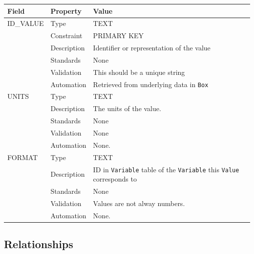 \documentclass[
]{article}
\newcounter{none}
\begin{document}
{\def\LTcaptype{none} 
\begin{longtable}[]{@{}
  >{\raggedright\arraybackslash}p{}
  >{\raggedright\arraybackslash}p{}
  >{\raggedright\arraybackslash}p{}@{}}
\toprule\noalign{}
\begin{minipage}[b]{\linewidth}\raggedright
Field
\end{minipage} & \begin{minipage}[b]{\linewidth}\raggedright
Property
\end{minipage} & \begin{minipage}[b]{\linewidth}\raggedright
Value
\end{minipage} \\
\midrule\noalign{}
\endhead
\bottomrule\noalign{}
\endlastfoot
ID\_VALUE & Type & TEXT \\
& Constraint & PRIMARY KEY \\
& Description & Identifier or representation of the value \\
& Standards & None \\
& Validation & This should be a unique string \\
& Automation & Retrieved from underlying data in \texttt{Box} \\
UNITS & Type & TEXT \\
& Description & The units of the value. \\
& Standards & None \\
& Validation & None \\
& Automation & None. \\
FORMAT & Type & TEXT \\
& Description & ID in \texttt{Variable} table of the \texttt{Variable}
this \texttt{Value} corresponds to \\
& Standards & None \\
& Validation & Values are not alway numbers. \\
& Automation & None. \\
\end{longtable}
}

\subsection{Relationships}\label{relationships-32}
\end{document}
